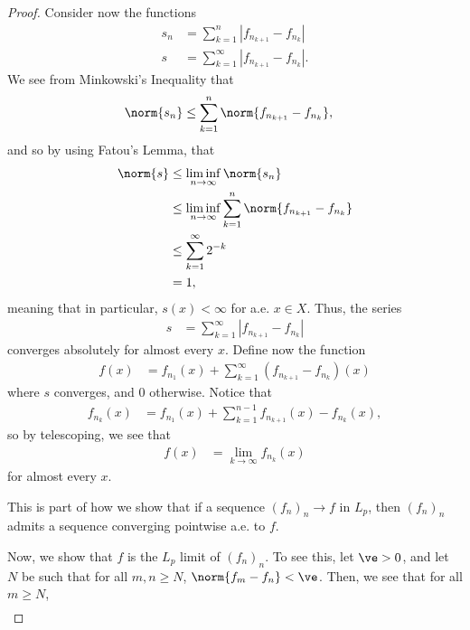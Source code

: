 \documentclass[10pt]{mypackage}
\begin{document}
\begin{proof}
  Consider now the functions
  \begin{align*}
    s_n &= \sum_{k=1}^{n} \left\vert f_{n_{k+1}} -f_{n_{k}} \right\vert\\
    s &= \sum_{k=1}^{\infty} \left\vert f_{n_{k+1}}-f_{n_{k}} \right\vert.
  \end{align*}
  We see from Minkowski's Inequality that
  \begin{align*}
    \norm{s_{n}} &\leq \sum_{k=1}^{n} \norm{f_{n_{k+1}}-f_{n_{k}}},
  \end{align*}
  and so by using Fatou's Lemma, that
  \begin{align*}
    \norm{s} &\leq \liminf_{n\rightarrow\infty} \norm{s_{n}}\\
             &\leq \liminf_{n\rightarrow\infty}\sum_{k=1}^{n} \norm{f_{n_{k+1}}-f_{n_{k}}}\\
             &\leq \sum_{k=1}^{\infty} 2^{-k}\\
             &= 1,
  \end{align*}
  meaning that in particular, $s(x)< \infty$ for a.e. $x\in X$. Thus, the series
  \begin{align*}
    s &= \sum_{k=1}^{\infty} \left\vert f_{n_{k+1}}-f_{n_{k}} \right\vert
  \end{align*}
  converges absolutely for almost every $x$. Define now the function
  \begin{align*}
    f(x) &= f_{n_{1}}(x) + \sum_{k=1}^{\infty} \left( f_{n_{k+1}}-f_{n_{k}} \right)(x)
  \end{align*}
  where $s$ converges, and $0$ otherwise. Notice that
  \begin{align*}
    f_{n_{k}}(x) &= f_{n_{1}}(x) + \sum_{k=1}^{n-1}f_{n_{k+1}}(x) - f_{n_{k}}(x),
  \end{align*}
  so by telescoping, we see that
  \begin{align*}
    f(x) &= \lim_{k\rightarrow\infty}f_{n_{k}}(x)
  \end{align*}
  for almost every $x$.
  \begin{remark}
    This is part of how we show that if a sequence $\left( f_{n} \right)_n\rightarrow f$ in $L_p$, then $\left( f_{n} \right)_{n}$ admits a sequence converging pointwise a.e. to $f$.
  \end{remark}
  Now, we show that $f$ is the $L_p$ limit of $\left( f_n \right)_n$. To see this, let $\ve > 0$, and let $N$ be such that for all $m,n \geq N$, $\norm{f_m - f_n} < \ve$. Then, we see that for all $m\geq N$,
  \begin{align*}

\end{align*}
\end{proof}
\end{document}
